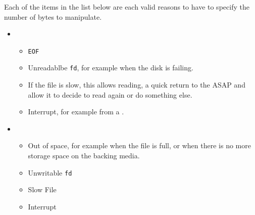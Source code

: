 Each of the items in the list below are each valid reasons to have to specify the number of bytes to manipulate.
\begin{itemize}
\item {}
  \begin{itemize}
  \item \texttt{EOF}
  \item Unreadablbe \texttt{fd}, for example when the disk is failing.
  \item If the file is slow, this allows reading, a quick return to the  ASAP and allow it to decide to read again or do something else.
  \item Interrupt, for example from a .
  \end{itemize}
\item {}
  \begin{itemize}
  \item Out of space, for example when the file is full, or when there is no more storage space on the backing media.
  \item Unwritable \texttt{fd}
  \item Slow File
  \item Interrupt
  \end{itemize}
\end{itemize}

